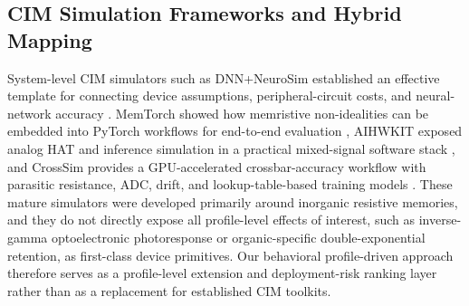 \subsection{CIM Simulation Frameworks and Hybrid Mapping}
\label{subsec:cim-frameworks-mapping}

System-level CIM simulators such as DNN+NeuroSim established an effective template for connecting device assumptions, peripheral-circuit costs, and neural-network accuracy \citep{peng2020dnnneurosim}. MemTorch showed how memristive non-idealities can be embedded into PyTorch workflows for end-to-end evaluation \citep{lammie2022memtorch}, AIHWKIT exposed analog HAT and inference simulation in a practical mixed-signal software stack \citep{rasch2021aihwkit}, and CrossSim provides a GPU-accelerated crossbar-accuracy workflow with parasitic resistance, ADC, drift, and lookup-table-based training models \citep{crosssim2024}. These mature simulators were developed primarily around inorganic resistive memories, and they do not directly expose all profile-level effects of interest, such as inverse-gamma optoelectronic photoresponse or organic-specific double-exponential retention, as first-class device primitives. Our behavioral profile-driven approach therefore serves as a profile-level extension and deployment-risk ranking layer rather than as a replacement for established CIM toolkits.
